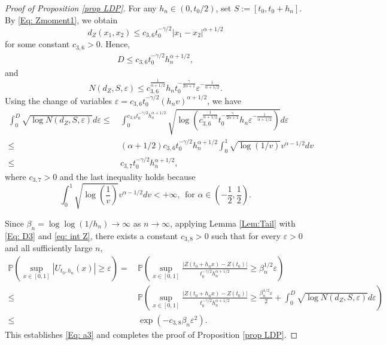 \documentclass[11pt, reqno]{amsart}
\numberwithin{equation}{section}
\newcommand{\1}{{\bf 1}}
\newcommand{\2}{{\bf 2}}
\begin{document}
\begin{proof}[Proof of Proposition \ref{prop LDP}]
 For any   $h_n\in (0, t_0/2)$, set $S:=[t_0, t_0+h_n]$.  By \eqref{Eq: Zmoment1}, we obtain 
 $$d_Z(x_1, x_2)\le c_{3,6}t_0^{-\gamma/2}|x_1-x_2|^{\alpha+1/2}$$
  for some constant $c_{3,6}>0$. Hence,
\begin{align}\label{Eq: D3}
D\le c_{3,6} t_0^{-\gamma/2}h_n^{\alpha+1/2},
\end{align}
   and
$$
N(d_Z, S, \varepsilon)\le c_{3,6}^{\frac{1}{\alpha+1/2}} h_n t_0^{-\frac{\gamma}{2\alpha+1}} \varepsilon^{-\frac{1}{\alpha+1/2}}.
$$
Using the change of  variables $\varepsilon=c_{3,6} t_0^{-\gamma/2}(h_nv)^{\alpha+1/2}$, we have
\begin{equation}\label{eq: int Z}
\begin{split}
\int_0^D\sqrt{\log  N\left(d_Z, S, \varepsilon\right)  }d\varepsilon\le&\, \int_0^{c_{3,6} t_0^{-\gamma/2}h_n^{\alpha+1/2}}
\sqrt{\log\left( c_{3,6}^{\frac{1}{\alpha+1/2}}    t_0^{-\frac{\gamma}{2\alpha+1}} h_n \varepsilon^{-\frac{1}{\alpha+1/2}}\right)  } d\varepsilon\\
\le  &\, (\alpha+1/2)c_{3,6}t_0^{-\gamma/2}h_n^{\alpha+1/2}\int_0^{1} \sqrt{ \log( 1/v)}  v^{\alpha-1/2}dv\\
\le &\, c_{3,7} t_0^{-\gamma/2}h_n^{\alpha+1/2},
\end{split}
\end{equation}
 {where  $c_{3,7}>0$ and the last inequality holds because}
$$ {\int_0^{1} \sqrt{ \log\left(\frac{1}{v}\right)}  v^{\alpha-1/2}dv<+\infty, \ \ \text{for } \alpha \in \left(-\frac12, \frac12\right).}$$
 

Since $\beta_n=  {\log\log} (1/h_n)\rightarrow \infty$ as $n\rightarrow\infty$,  applying  Lemma \ref{Lem:Tail}   with \eqref{Eq: D3} and  \eqref{eq: int Z},
there exists a constant $c_{3,8}>0$ such that   for every   $\varepsilon>0$ and all sufficiently large  $n$,
\begin{align*} 
 \mathbb P\left(\sup_{x\in [0,1]}|U_{t_0, h_n}(x)|\ge \varepsilon\right)
=&\,\mathbb P\left(\sup_{x\in [0,1]} \frac{|Z(t_0+ {h_n}x)-Z(t_0)|}{  t_0^{-\gamma/2} h_n^{\alpha+1/2}}
\ge  \beta_n^{1/2} \varepsilon\right)\\
\le &\, {\mathbb P\left(\sup_{x\in [0,1]} \frac{|Z(t_0+ {h_n}x)-Z(t_0)|}{  t_0^{-\gamma/2} h_n^{\alpha+1/2}}
\ge  \frac{\beta_n^{1/2} \varepsilon}{2}+ \int_0^D\sqrt{\log  N(d_Z, S, \varepsilon) }d\varepsilon\right)}\\
\le&\,  \exp\left(-c_{3,8} \beta_n \varepsilon^2\right).  
\end{align*}
 This establishes \eqref{Eq: a3} and completes the proof of Proposition \ref{prop LDP}.
    \end{proof}
\end{document}
